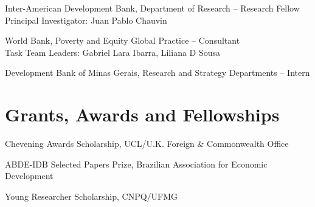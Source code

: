 \documentclass[11pt,letterpaper]{report}
\begin{document}
    \begin{tablist}

        \item[2021-23]   \tab{}Inter-American Development Bank, Department of Research -- Research Fellow\\
                              Principal Investigator: Juan Pablo Chauvin

        \item[2020-21]   \tab{}World Bank, Poverty and Equity Global Practice -- Consultant \\
                              Task Team Leaders: Gabriel Lara Ibarra, Liliana D Sousa

        \item[2015-17]   \tab{}Development Bank of Minas Gerais, Research and Strategy Departments -- Intern




    \end{tablist}

    \section*{Grants, Awards and Fellowships}



    \begin{tablist}
        \item[2018] \tab{}Chevening Awards Scholarship, UCL/U.K. Foreign \& Commonwealth Office \\
        \item[2018] \tab{}ABDE-IDB Selected Papers Prize, Brazilian Association for Economic Development \\
        \item[2014] \tab{}Young Researcher Scholarship, CNPQ/UFMG  \\

    \end{tablist}
\end{document}
